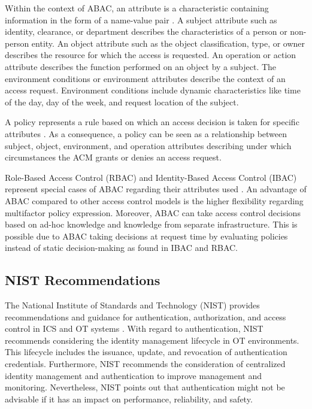 Within the context of ABAC, an attribute is a characteristic containing information in the form of a name-value pair \cite{Hu2014}.
A subject attribute such as identity, clearance, or department describes the characteristics of a person or non-person entity.
An object attribute such as the object classification, type, or owner describes the resource for which the access is requested.
An operation or action attribute describes the function performed on an object by a subject.
The environment conditions or environment attributes describe the context of an access request.
Environment conditions include dynamic characteristics like time of the day, day of the week, and request location of the subject.

A policy represents a rule based on which an access decision is taken for specific attributes \cite{Hu2014}.
As a consequence, a policy can be seen as a relationship between subject, object, environment, and operation attributes describing under which circumstances the ACM grants or denies an access request.

Role-Based Access Control (RBAC) and Identity-Based Access Control (IBAC) represent special cases of ABAC regarding their attributes used \cite{Hu2014}.
An advantage of ABAC compared to other access control models is the higher flexibility regarding multifactor policy expression.
Moreover, ABAC can take access control decisions based on ad-hoc knowledge and knowledge from separate infrastructure.
This is possible due to ABAC taking decisions at request time by evaluating policies instead of static decision-making as found in IBAC and RBAC.

\subsection{NIST Recommendations}
The National Institute of Standards and Technology (NIST) provides recommendations and guidance for authentication, authorization, and access control in ICS \cite{Stouffer2015} and OT systems \cite{Stouffer2023}.
With regard to authentication, NIST recommends considering the identity management lifecycle in OT environments.
This lifecycle includes the issuance, update, and revocation of authentication credentials.
Furthermore, NIST recommends the consideration of centralized identity management and authentication to improve management and monitoring.
Nevertheless, NIST points out that authentication might not be advisable if it has an impact on performance, reliability, and safety.

